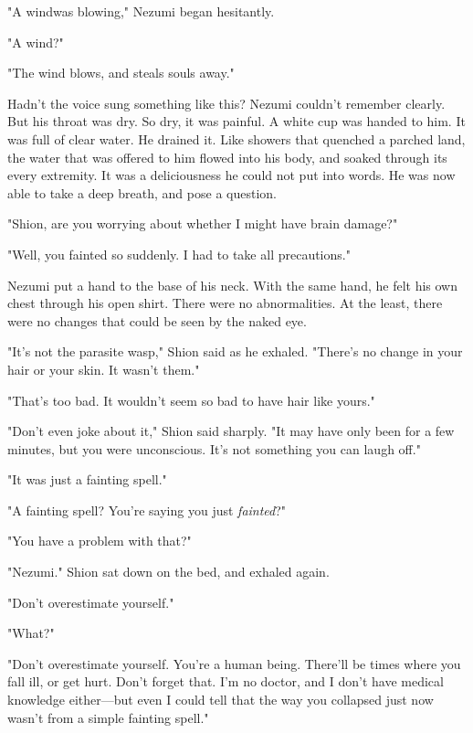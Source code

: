 "A wind\el was blowing," Nezumi began hesitantly.

"A wind?"

"The wind blows, and steals souls away."

\clearpage


Hadn't the voice sung something like this? Nezumi couldn't remember
clearly. But his throat was dry. So dry, it was painful. A white cup was
handed to him. It was full of clear water. He drained it. Like showers
that quenched a parched land, the water that was offered to him flowed
into his body, and soaked through its every extremity. It was a
deliciousness he could not put into words. He was now able to take a
deep breath, and pose a question.

"Shion, are you worrying about whether I might have brain damage?"

"Well, you fainted so suddenly. I had to take all precautions."

Nezumi put a hand to the base of his neck. With the same hand, he felt
his own chest through his open shirt. There were no abnormalities. At
the least, there were no changes that could be seen by the naked eye.

"It's not the parasite wasp," Shion said as he exhaled. "There's no
change in your hair or your skin. It wasn't them."

"That's too bad. It wouldn't seem so bad to have hair like yours."

"Don't even joke about it," Shion said sharply. "It may have only been
for a few minutes, but you were unconscious. It's not something you can
laugh off."

"It was just a fainting spell."

"A fainting spell? You're saying you just \emph{fainted}?"

"You have a problem with that?"

"Nezumi." Shion sat down on the bed, and exhaled again.

"Don't overestimate yourself."

"What?"

"Don't overestimate yourself. You're a human being. There'll be times
where you fall ill, or get hurt. Don't forget that. I'm no doctor, and I
don't have medical knowledge either---but even I could tell that the way
you collapsed just now wasn't from a simple fainting spell."

